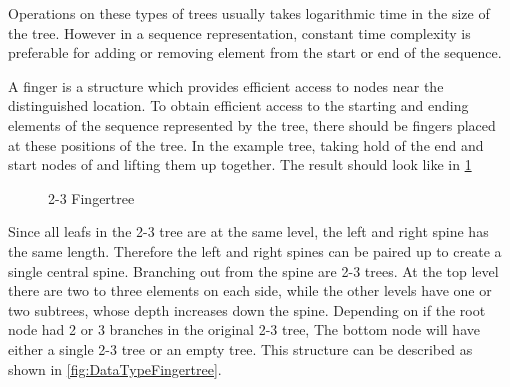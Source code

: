 Operations on these types of trees usually takes logarithmic time in the size of
the tree. However in a sequence representation, constant time complexity is
preferable for adding or removing element from the start or end of the sequence.

A finger is a structure which provides efficient access to nodes near the
distinguished location. To obtain efficient access to the starting and ending
elements of the sequence represented by the tree, there should be fingers placed
at these positions of the tree. In the example tree, taking hold of the end and start
nodes of and lifting them up together. The result should look like in
\cref{fig:fingertree}

\begin{figure}[!h]
\centering
{} 
\caption{2-3 Fingertree
\label{fig:fingertree}}
\end{figure}

Since all leafs in the 2-3 tree are at the same level, the left and right
spine has the same length. Therefore the left and right spines can be paired up
to create a single central spine. Branching out from the spine are 2-3 trees. At
the top level there are two to three elements on each side, while the other
levels have one or two subtrees, whose depth increases down the spine.
Depending on if the root node had 2 or 3 branches in the original 2-3 tree, The
bottom node will have either a single 2-3 tree or an empty tree. This structure
can be described as shown in \cref{fig:DataTypeFingertree}.

